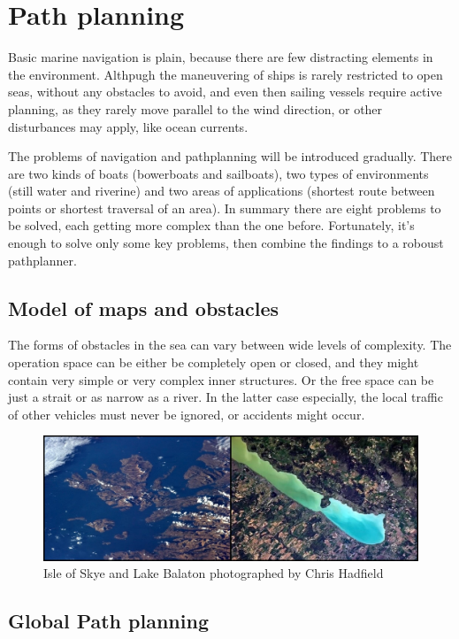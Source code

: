 \section{Path planning} 

Basic marine navigation is plain, because there are few distracting elements in the environment. Althpugh the maneuvering of ships is rarely restricted to open seas, without any obstacles to avoid, and even then sailing vessels require active planning, as they rarely move parallel to the wind direction, or other disturbances may apply, like ocean currents.

The problems of navigation and pathplanning will be introduced gradually. There are two kinds of boats (bowerboats and sailboats), two types of environments (still water and riverine) and two areas of applications (shortest route between points or shortest traversal of an area). In summary there are eight problems to be solved, each getting more complex than the one before. Fortunately, it's enough to solve only some key problems, then combine the findings to a roboust pathplanner.

\subsection{Model of maps and obstacles}

The forms of obstacles in the sea can vary between wide levels of complexity. The operation space can be either be completely open or closed, and they might contain very simple or very complex inner structures. Or the free space can be just a strait or as narrow as a river. In the latter case especially, the local traffic of other vehicles must never be ignored, or accidents might occur.

\begin{figure}[H]
	\centering
	\includegraphics[width=\textwidth]{pics/hadfield}
	\caption{Isle of Skye and Lake Balaton photographed by Chris Hadfield}
	\label{fig:linemap}
\end{figure}

\subsection{Global Path planning}

